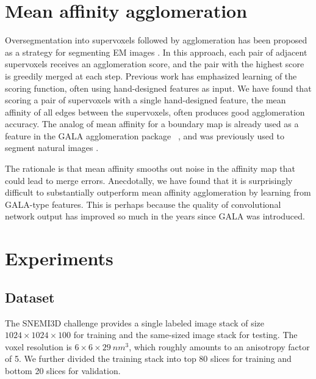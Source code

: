 \documentclass{article}
\begin{document}
\section{Mean affinity agglomeration}
\label{mean_affinity}

Oversegmentation into supervoxels followed by agglomeration has been proposed as
a strategy for segmenting EM images \cite{jain2011learning, nunez-iglesias2013,
bogovic2013learned, nunez2014graph}.  In this approach, each pair of adjacent
supervoxels receives an agglomeration score, and the pair with the highest score
is greedily merged at each step. Previous work has emphasized learning of the
scoring function, often using hand-designed features as input.  We have found
that scoring a pair of supervoxels with a single hand-designed feature, the mean
affinity of all edges between the supervoxels, often produces good agglomeration
accuracy.  The analog of mean affinity for a boundary map is already used as a
feature in the GALA agglomeration package
~\cite{nunez-iglesias2013,nunez2014graph}, and was previously used to segment
natural images \cite{arbelaez2011}.

The rationale is that mean affinity smooths out noise in the affinity map that
could lead to merge errors.  Anecdotally, we have found that it is surprisingly
difficult to substantially outperform mean affinity agglomeration by learning
from GALA-type features. This is perhaps because the quality of convolutional
network output has improved so much in the years since GALA was introduced.

\section{Experiments}
\label{experiments}

\subsection{Dataset}

The SNEMI3D challenge provides a single labeled image stack of size
$1024\times1024\times100$ for training and the same-sized image stack for
testing. The voxel resolution is $6\times6\times29~nm^3$, which roughly amounts
to an anisotropy factor of 5. We further divided the training stack into top 80
slices for training and bottom 20 slices for validation.
\end{document}
